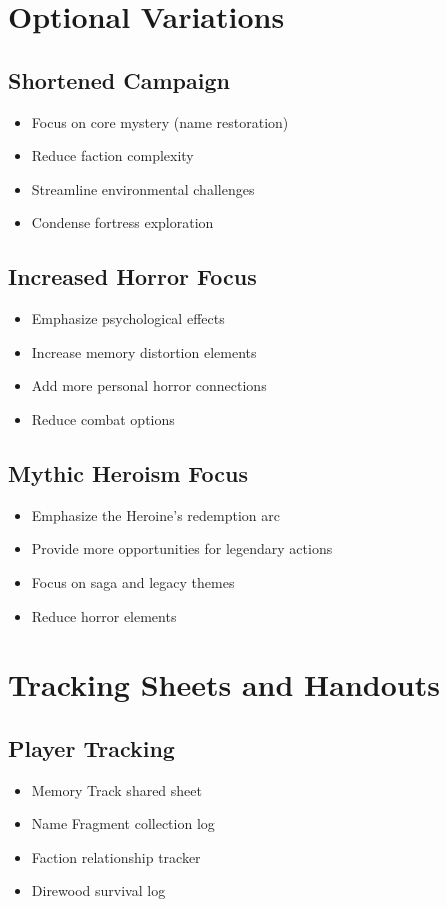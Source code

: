 \documentclass[11pt]{article}
\begin{document}
\section{Optional Variations}

\subsection{Shortened Campaign}
\begin{itemize}
    \item Focus on core mystery (name restoration)
    \item Reduce faction complexity
    \item Streamline environmental challenges
    \item Condense fortress exploration
\end{itemize}

\subsection{Increased Horror Focus}
\begin{itemize}
    \item Emphasize psychological effects
    \item Increase memory distortion elements
    \item Add more personal horror connections
    \item Reduce combat options
\end{itemize}

\subsection{Mythic Heroism Focus}
\begin{itemize}
    \item Emphasize the Heroine's redemption arc
    \item Provide more opportunities for legendary actions
    \item Focus on saga and legacy themes
    \item Reduce horror elements
\end{itemize}

\section{Tracking Sheets and Handouts}

\subsection{Player Tracking}
\begin{itemize}
    \item Memory Track shared sheet
    \item Name Fragment collection log
    \item Faction relationship tracker
    \item Direwood survival log
\end{itemize}
\end{document}
